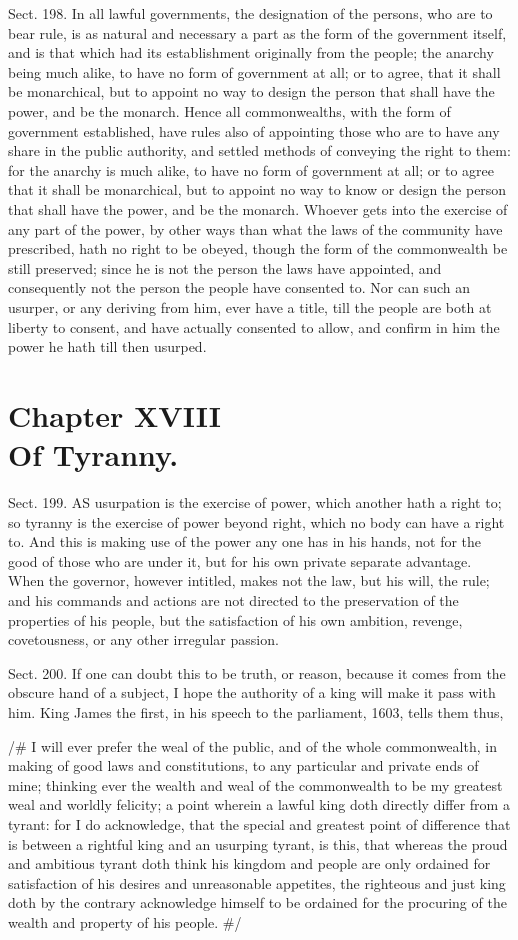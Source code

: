\documentclass[11pt,openany]{book}
\newcommand{\bookchapter}[2]{%
  \clearpage\phantomsection
  \chapter*{{\normalfont\sffamily\small\mdseries #1}\\[6pt]#2}%
  \addcontentsline{toc}{chapter}{#1\quad #2}%
  \markboth{#2}{#2}\thispagestyle{plain}}
\begin{document}
Sect. 198. In all lawful governments, the designation of the persons, who are to bear rule, is as natural and necessary a part as the form of the government itself, and is that which had its establishment originally from the people; the anarchy being much alike, to have no form of government at all; or to agree, that it shall be monarchical, but to appoint no way to design the person that shall have the power, and be the monarch. Hence all commonwealths, with the form of government established, have rules also of appointing those who are to have any share in the public authority, and settled methods of conveying the right to them: for the anarchy is much alike, to have no form of government at all; or to agree that it shall be monarchical, but to appoint no way to know or design the person that shall have the power, and be the monarch. Whoever gets into the exercise of any part of the power, by other ways than what the laws of the community have prescribed, hath no right to be obeyed, though the form of the commonwealth be still preserved; since he is not the person the laws have appointed, and consequently not the person the people have consented to. Nor can such an usurper, or any deriving from him, ever have a title, till the people are both at liberty to consent, and have actually consented to allow, and confirm in him the power he hath till then usurped.

\bookchapter{Chapter XVIII}{Of Tyranny.}

Sect. 199. AS usurpation is the exercise of power, which another hath a right to; so tyranny is the exercise of power beyond right, which no body can have a right to. And this is making use of the power any one has in his hands, not for the good of those who are under it, but for his own private separate advantage. When the governor, however intitled, makes not the law, but his will, the rule; and his commands and actions are not directed to the preservation of the properties of his people, but the satisfaction of his own ambition, revenge, covetousness, or any other irregular passion.

Sect. 200. If one can doubt this to be truth, or reason, because it comes from the obscure hand of a subject, I hope the authority of a king will make it pass with him. King James the first, in his speech to the parliament, 1603, tells them thus,

/\# I will ever prefer the weal of the public, and of the whole commonwealth, in making of good laws and constitutions, to any particular and private ends of mine; thinking ever the wealth and weal of the commonwealth to be my greatest weal and worldly felicity; a point wherein a lawful king doth directly differ from a tyrant: for I do acknowledge, that the special and greatest point of difference that is between a rightful king and an usurping tyrant, is this, that whereas the proud and ambitious tyrant doth think his kingdom and people are only ordained for satisfaction of his desires and unreasonable appetites, the righteous and just king doth by the contrary acknowledge himself to be ordained for the procuring of the wealth and property of his people. \#/
\end{document}
